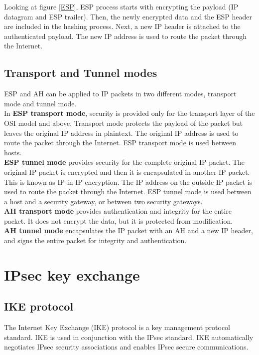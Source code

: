 Looking at figure \ref{ESP}, ESP process starts with encrypting the payload (IP datagram and ESP trailer). Then, the newly encrypted data and the ESP header are included in the hashing process. Next, a new IP header is attached to the authenticated payload. The new IP address is used to route the packet through the Internet.\\

\subsection{Transport and Tunnel modes}

ESP and AH can be applied to IP packets in two different modes, transport mode and tunnel mode. \\

In \textbf{ESP transport mode}, security is provided only for the transport layer of the OSI model and above. Transport mode protects the payload of the packet but leaves the original IP address in plaintext. The original IP address is used to route the packet through the Internet. ESP transport mode is used between hosts.\\

\textbf{ESP tunnel mode} provides security for the complete original IP packet. The original IP packet is encrypted and then it is encapsulated in another IP packet. This is known as IP-in-IP encryption. The IP address on the outside IP packet is used to route the packet through the Internet. ESP tunnel mode is used between a host and a security gateway, or between two security gateways.\\

\textbf{AH transport mode} provides authentication and integrity for the entire packet. It does not encrypt the data, but it is protected from modification.\\

\textbf{AH tunnel mode} encapsulates the IP packet with an AH and a new IP header, and signs the entire packet for integrity and authentication.

\section{IPsec key exchange}

\subsection{IKE protocol}

The Internet Key Exchange (IKE) protocol is a key management protocol standard. IKE is used in conjunction with the IPsec standard. IKE automatically negotiates IPsec security associations and enables IPsec secure communications. \\

